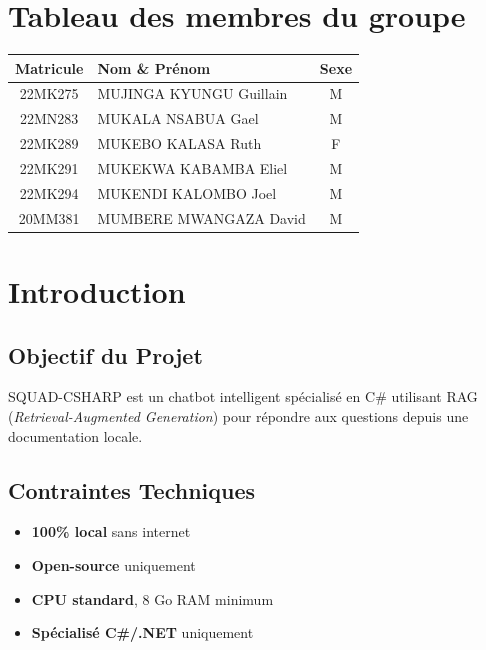 \documentclass[12pt,a4paper]{report}
\begin{document}
\section*{Tableau des membres du groupe}
\renewcommand{\arraystretch}{1.5} %
\begin{tabularx}{\textwidth}{|c|X|c|}
\hline
\rowcolor{green!30}
\textbf{Matricule} & \textbf{Nom \& Prénom} & \textbf{Sexe} \\
\hline
22MK275 & MUJINGA KYUNGU Guillain & M \\
22MN283 & MUKALA NSABUA Gael & M \\
22MK289 & MUKEBO KALASA Ruth & F \\
22MK291 & MUKEKWA KABAMBA Eliel & M \\
22MK294 & MUKENDI KALOMBO Joel & M \\
20MM381 & MUMBERE MWANGAZA David & M \\
\hline
\end{tabularx}

\newpage
\section{Introduction}

\subsection{Objectif du Projet}
SQUAD-CSHARP est un chatbot intelligent spécialisé en C\# utilisant RAG (\textit{Retrieval-Augmented Generation}) pour répondre aux questions depuis une documentation locale.

\subsection{Contraintes Techniques}
\begin{itemize}
    \item \textbf{100\% local} sans internet
    \item \textbf{Open-source} uniquement
    \item \textbf{CPU standard}, 8 Go RAM minimum
    \item \textbf{Spécialisé C\#/.NET} uniquement
\end{itemize}
\end{document}
